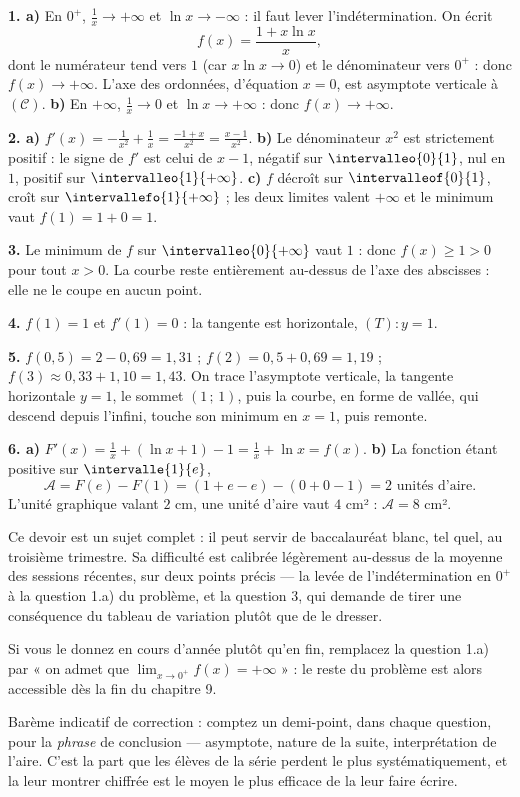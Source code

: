 \begin{corrige}
\textbf{1. a)} En $0^{+}$, $\frac1x \to +\infty$ et $\ln x \to -\infty$ :
il faut lever l'indétermination. On écrit
\[
  f(x) = \frac{1+x\ln x}{x},
\]
dont le numérateur tend vers $1$ (car $x\ln x \to 0$) et le dénominateur
vers $0^{+}$ : donc $f(x) \to +\infty$. L'axe des ordonnées, d'équation
$x = 0$, est asymptote verticale à $(\mathcal C)$.
\textbf{b)} En $+\infty$, $\frac1x \to 0$ et $\ln x \to +\infty$ : donc
$f(x) \to +\infty$.

\textbf{2. a)} $f'(x) = -\frac{1}{x^{2}}+\frac1x
= \frac{-1+x}{x^{2}} = \frac{x-1}{x^{2}}$.
\textbf{b)} Le dénominateur $x^{2}$ est strictement positif : le signe de
$f'$ est celui de $x-1$, négatif sur $\intervalleo{0}{1}$, nul en $1$,
positif sur $\intervalleo{1}{+\infty}$.
\textbf{c)} $f$ décroît sur $\intervalleof{0}{1}$, croît sur
$\intervallefo{1}{+\infty}$ ; les deux limites valent $+\infty$ et le
minimum vaut $f(1) = 1+0 = 1$.

\textbf{3.} Le minimum de $f$ sur $\intervalleo{0}{+\infty}$ vaut $1$ :
donc $f(x) \geq 1 > 0$ pour tout $x>0$. La courbe reste entièrement
au-dessus de l'axe des abscisses : elle ne le coupe en aucun point.

\textbf{4.} $f(1) = 1$ et $f'(1) = 0$ : la tangente est horizontale,
$(T) : y = 1$.

\textbf{5.} $f(0{,}5) = 2-0{,}69 = 1{,}31$ ;
$f(2) = 0{,}5+0{,}69 = 1{,}19$ ; $f(3) \approx 0{,}33+1{,}10 = 1{,}43$. On
trace l'asymptote verticale, la tangente horizontale $y = 1$, le sommet
$(1\,;\,1)$, puis la courbe, en forme de vallée, qui descend depuis
l'infini, touche son minimum en $x = 1$, puis remonte.

\textbf{6. a)} $F'(x) = \frac1x+\left(\ln x+1\right)-1 = \frac1x+\ln x
= f(x)$. \checkmark
\textbf{b)} La fonction étant positive sur $\intervalle{1}{e}$,
\[
  \mathcal A = F(e)-F(1) = \left(1+e-e\right)-\left(0+0-1\right) = 2
  \text{ unités d'aire}.
\]
L'unité graphique valant $2$ cm, une unité d'aire vaut $4$ cm² :
$\mathcal A = 8$ cm².
\end{corrige}

\begin{notepourlaclasse}
Ce devoir est un sujet complet : il peut servir de baccalauréat blanc, tel
quel, au troisième trimestre. Sa difficulté est calibrée légèrement
au-dessus de la moyenne des sessions récentes, sur deux points précis — la
levée de l'indétermination en $0^{+}$ à la question 1.a) du problème, et la
question 3, qui demande de tirer une conséquence du tableau de variation
plutôt que de le dresser.

Si vous le donnez en cours d'année plutôt qu'en fin, remplacez la question
1.a) par « on admet que $\displaystyle\lim_{x \to 0^{+}} f(x) = +\infty$ » :
le reste du problème est alors accessible dès la fin du chapitre 9.

Barème indicatif de correction : comptez un demi-point, dans chaque
question, pour la \emph{phrase} de conclusion — asymptote, nature de la
suite, interprétation de l'aire. C'est la part que les élèves de la série
perdent le plus systématiquement, et la leur montrer chiffrée est le moyen
le plus efficace de la leur faire écrire.
\end{notepourlaclasse}
